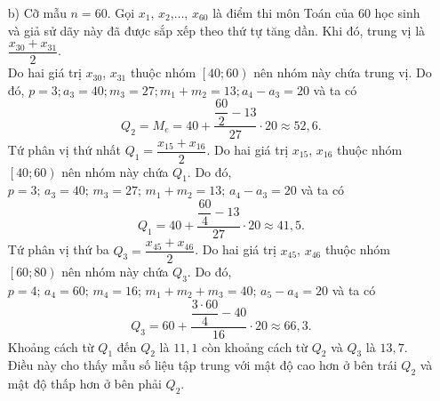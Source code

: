 \begin{bt}
{\begin{enumerate}
			\item [b)] Cỡ mẫu $n=60$. Gọi $x_1$, $x_2$,$\ldots$, $x_{60}$ là điểm thi môn Toán của 60 học sinh và giả sử dãy này đã được sắp xếp theo thứ tự tăng dần. Khi đó, trung vị là $\dfrac{x_{30}+x_{31}}{2}$.\\
			      Do hai giá trị $x_{30}$, $x_{31}$ thuộc nhóm $\left[40;60\right)$ nên nhóm này chứa trung vị. Do đó, $p=3;a_3=40;m_3=27;m_1+m_2=13;a_4-a_3=20$ và ta có
			      $$Q_2=M_e=40+\dfrac{\dfrac{60}{2}-13}{27}\cdot 20\approx 52{,}6.$$
			      Tứ phân vị thứ nhất $Q_1=\dfrac{x_{15}+x_{16}}{2}$. Do hai giá trị $x_{15}$, $x_{16}$ thuộc nhóm $\left[40;60\right)$ nên nhóm này chứa $Q_1$. Do đó, $p=3;\,a_3=40;\,m_3=27;\,m_1+m_2=13;\,a_4-a_3=20$ và ta có
			      $$Q_1=40+\dfrac{\dfrac{60}{4}-13}{27}\cdot 20\approx 41{,}5.$$
			      Tứ phân vị thứ ba $Q_3=\dfrac{x_{45}+x_{46}}{2}$. Do hai giá trị $x_{45}$, $x_{46}$ thuộc nhóm $\left[60;80\right)$ nên nhóm này chứa $Q_3$. Do đó, $p=4;\,a_4=60;\,m_4=16;\,m_1+m_2+m_3=40;\,a_5-a_4=20$ và ta có
			      $$Q_3=60+\dfrac{\dfrac{3\cdot 60}{4}-40}{16}\cdot 20\approx 66{,}3.$$
			      Khoảng cách từ $Q_1$ đến $Q_2$ là $11{,}1$ còn khoảng cách từ $Q_2$ và $Q_3$ là $13{,}7$. Điều này cho thấy mẫu số liệu tập trung với mật độ cao hơn ở bên trái $Q_2$ và mật độ thấp hơn ở bên phải $Q_2$.
		\end{enumerate}
	}
\end{bt}
